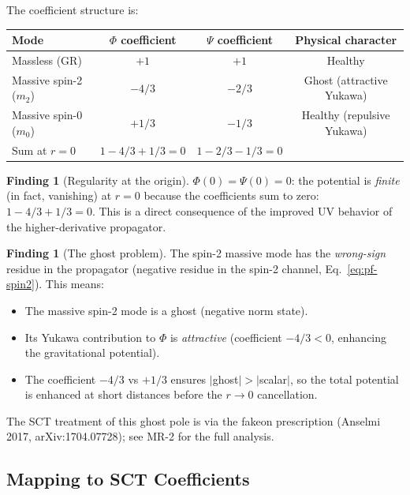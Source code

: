 \documentclass[11pt,a4paper]{article}
\theoremstyle{plain}
\theoremstyle{definition}
\newtheorem{finding}[theorem]{Finding}
\theoremstyle{remark}
\begin{document}
\noindent The coefficient structure is:
\begin{center}
\begin{tabular}{lccc}
\toprule
Mode & $\Phi$ coefficient & $\Psi$ coefficient & Physical character \\
\midrule
Massless (GR) & $+1$ & $+1$ & Healthy \\
Massive spin-2 ($m_2$) & $-4/3$ & $-2/3$ & Ghost (attractive Yukawa) \\
Massive spin-0 ($m_0$) & $+1/3$ & $-1/3$ & Healthy (repulsive Yukawa) \\
\midrule
Sum at $r = 0$ & $1 - 4/3 + 1/3 = 0$ & $1 - 2/3 - 1/3 = 0$ & \\
\bottomrule
\end{tabular}
\end{center}

\begin{finding}[Regularity at the origin]\label{find:V0}
$\Phi(0) = \Psi(0) = 0$: the potential is \emph{finite} (in fact,
vanishing) at $r = 0$ because the coefficients sum to zero:
$1 - 4/3 + 1/3 = 0$.  This is a direct consequence of the improved
UV behavior of the higher-derivative propagator.
\end{finding}

\begin{finding}[The ghost problem]\label{find:ghost}
The spin-2 massive mode has the \emph{wrong-sign} residue in the
propagator (negative residue in the spin-2 channel, Eq.~\eqref{eq:pf-spin2}).
This means:
\begin{itemize}[nosep]
  \item The massive spin-2 mode is a ghost (negative norm state).
  \item Its Yukawa contribution to $\Phi$ is \emph{attractive}
    (coefficient $-4/3 < 0$, enhancing the gravitational potential).
  \item The coefficient $-4/3$ vs $+1/3$ ensures $|$ghost$|
    > |$scalar$|$, so the total potential is enhanced at short
    distances before the $r \to 0$ cancellation.
\end{itemize}
The SCT treatment of this ghost pole is via the fakeon prescription
(Anselmi 2017, arXiv:1704.07728); see MR-2 for the full analysis.
\end{finding}

\subsection{Mapping to SCT Coefficients}
\end{document}
